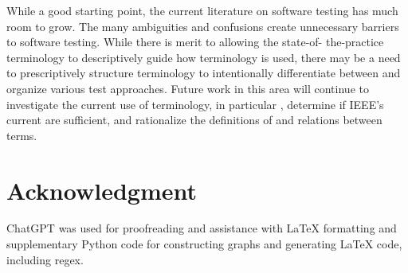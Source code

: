\documentclass[conference]{IEEEtran}
\begin{document}
While a good starting point, the current literature on software testing has
much room to grow. The many ambiguities and confusions create unnecessary
barriers to software testing. While there is merit to allowing the state-of-%
the-practice terminology to descriptively guide how terminology is used, there
may be a need to prescriptively structure terminology to intentionally
differentiate between and organize various test approaches. Future work in this
area will continue to investigate the current use of terminology, in
particular , determine if IEEE's current
 are sufficient, and rationalize the definitions of
and relations between terms.

\section*{Acknowledgment}

ChatGPT was used for proofreading and assistance with \LaTeX{} formatting and
supplementary Python code for constructing graphs and generating \LaTeX{} code,
including regex. 

\newpage



\end{document}
